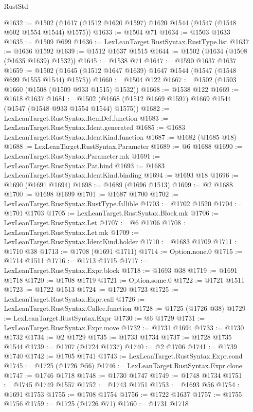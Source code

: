 \begin{lexlean}{RustStd}
\begin{coremodule}
@1632 := @1502 (@1617 (@1512 @1620 @1597) @1620 @1544 (@1547 (@1548 @602 @1554 @1544) @1575))
@1633 := @1504 @71
@1634 := @1503 @1633
@1635 := @1509 @699
@1636 := LexLeanTarget.RustSyntax.RustType.list
@1637 := @1636 @1592
@1639 := @1512 @1637 @1515
@1644 := @1502 (@1634 (@1508 (@1635 @1639) @1532))
@1645 := @1538 @71
@1647 := @1590 @1637 @1637
@1659 := @1502 (@1645 (@1512 @1647 @1639) @1647 @1544 (@1547 (@1548 @699 @1555 @1544) @1575))
@1660 := @1504 @122
@1667 := @1502 (@1503 @1660 (@1508 (@1509 @933 @1515) @1532))
@1668 := @1538 @122
@1669 := @1618 @1637
@1681 := @1502 (@1668 (@1512 @1669 @1597) @1669 @1544 (@1547 (@1548 @933 @1554 @1544) @1575))
@1682 := LexLeanTarget.RustSyntax.ItemDef.function
@1683 := LexLeanTarget.RustSyntax.Ident.generated
@1685 := @1683 LexLeanTarget.RustSyntax.IdentKind.function
@1687 := @1682 (@1685 @18)
@1688 := LexLeanTarget.RustSyntax.Parameter
@1689 := @6 @1688
@1690 := LexLeanTarget.RustSyntax.Parameter.mk
@1691 := LexLeanTarget.RustSyntax.Pat.bind
@1693 := @1683 LexLeanTarget.RustSyntax.IdentKind.binding
@1694 := @1693 @18
@1696 := @1690 (@1691 @1694)
@1698 := @1689 (@1696 @1513)
@1699 := @2 @1688
@1700 := @1698 @1699
@1701 := @1687 @1700
@1702 := LexLeanTarget.RustSyntax.RustType.fallible
@1703 := @1702 @1520
@1704 := @1701 @1703
@1705 := LexLeanTarget.RustSyntax.Block.mk
@1706 := LexLeanTarget.RustSyntax.Let
@1707 := @6 @1706
@1708 := LexLeanTarget.RustSyntax.Let.mk
@1709 := LexLeanTarget.RustSyntax.IdentKind.holder
@1710 := @1683 @1709
@1711 := @1710 @38
@1713 := @1708 (@1691 @1711)
@1714 := Option.none.{0}
@1715 := @1714 @1511
@1716 := @1713 @1715
@1717 := LexLeanTarget.RustSyntax.Expr.block
@1718 := @1693 @38
@1719 := @1691 @1718
@1720 := @1708 @1719
@1721 := Option.some.{0}
@1722 := @1721 @1511
@1723 := @1722 @1513
@1724 := @1720 @1723
@1725 := LexLeanTarget.RustSyntax.Expr.call
@1726 := LexLeanTarget.RustSyntax.Callee.function
@1728 := @1725 (@1726 @38)
@1729 := LexLeanTarget.RustSyntax.Expr
@1730 := @6 @1729
@1731 := LexLeanTarget.RustSyntax.Expr.move
@1732 := @1731 @1694
@1733 := @1730 @1732
@1734 := @2 @1729
@1735 := @1733 @1734
@1737 := @1728 @1735 @1544
@1739 := @1707 (@1724 @1737)
@1740 := @2 @1706
@1741 := @1739 @1740
@1742 := @1705 @1741
@1743 := LexLeanTarget.RustSyntax.Expr.cond
@1745 := @1725 (@1726 @56)
@1746 := LexLeanTarget.RustSyntax.Expr.clone
@1747 := @1746 @1718
@1748 := @1730 @1747
@1749 := @1748 @1734
@1751 := @1745 @1749 @1557
@1752 := @1743 @1751
@1753 := @1693 @56
@1754 := @1691 @1753
@1755 := @1708 @1754
@1756 := @1722 @1637
@1757 := @1755 @1756
@1759 := @1725 (@1726 @71)
@1760 := @1731 @1718

\end{coremodule}
\end{lexlean}
